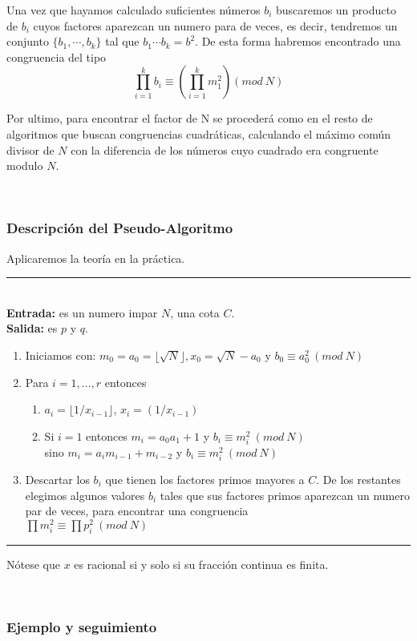 \documentclass[11pt, conference]{IEEEtran}
\begin{document}
Una vez que hayamos calculado suficientes números  $b_i$ buscaremos un producto de $b_i$ cuyos factores aparezcan un numero para de veces, es decir, tendremos un conjunto $\{b_1,\cdots,b_k\}$ tal que $b_1\cdots b_k = b^2$. De esta forma habremos encontrado una congruencia del tipo 
\[
	\prod_{i=1}^kb_i\equiv\left( \prod_{i=1}^{k}m^2_1 \right)(mod\ N)
\]

Por ultimo, para encontrar el factor de N se procederá como en el resto de algoritmos que buscan congruencias cuadráticas, calculando el máximo común divisor de $N$  con la diferencia de los números cuyo cuadrado era congruente modulo $N$.

\

\subsubsection[Descripción del Pseudo-Algoritmo]{\textbf{Descripción del Pseudo-Algoritmo}}

Aplicaremos la teoría en la práctica.\\ 
\rule[0mm]{181mm}{0.1mm}\\
\textbf{Entrada:} es un numero impar $N$, una cota $C$.\\
\textbf{Salida:} es $p$ y $q$.
\begin{enumerate}
	\item Iniciamos con: $m_0=a_0=\lfloor\sqrt{N}\rfloor,x_0=\sqrt{N}-a_0$ y $b_0\equiv a_0^2\ (mod\ N)$
	\item Para $i=1,...,r$ entonces
	\begin{enumerate}
		\item $a_i=\lfloor1/x_{i-1}\rfloor$, $x_i=(1/x_{i-1})$
		\item Si $i=1$ entonces $m_i=a_0a_1+1$ y $b_i\equiv m_i^2\ (mod\ N)$\\
		sino $m_i = a_im_{i-1}+m_{i-2}$ y $b_i\equiv m_i^2\ (mod\ N)$
	\end{enumerate}
	\item Descartar los $b_i$ que tienen los factores primos mayores a $C$. De los restantes elegimos algunos valores $b_i$ tales que sus factores primos aparezcan un numero par de veces, para encontrar una congruencia \\$\prod m^2_i\equiv\prod p_i^2\ (mod\ N)$
\end{enumerate}
\rule[3mm]{181mm}{0.1mm}
Nótese que $x$ es racional si y solo si su fracción continua es finita.

\

\subsubsection[Ejemplo y seguimiento]{\textbf{Ejemplo y seguimiento}}
\end{document}
